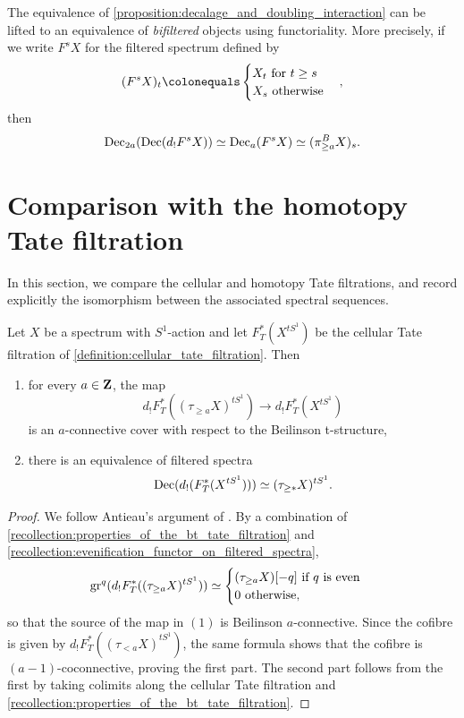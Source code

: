 \documentclass[oneside,a4paper]{amsart}
\begin{document}
\begin{remark}
\label{remark:bifiltered_refinement_of_the_interaction_between_decalage_and_doubling}
The equivalence of \cref{proposition:decalage_and_doubling_interaction} can be lifted to an equivalence of \emph{bifiltered} objects using functoriality. More precisely, if we write $F^{s} X$ for the filtered spectrum defined by 
\[
(F^{s} X)_{t} \colonequals \begin{cases} X_{t} \textnormal{ for } t \geq s \\
X_{s} \textnormal{ otherwise}  
\end{cases}, 
\]
then
\[
\mathrm{Dec}_{2a}(\mathrm{Dec}(d_{!} F^{s}X)) \simeq \mathrm{Dec}_{a}(F^{s}X) \simeq (\pi_{\geq a}^{B} X)_{s}.
\]
\end{remark}

\section{Comparison with the homotopy Tate filtration}

In this section, we compare the cellular and homotopy Tate filtrations, and record explicitly the isomorphism between the associated spectral sequences. 

\begin{theorem}
\label{theorem:decalage_of_evenification_of_bhatt_lurie_tate_is_the_tate_of_postnikov}
Let $X$ be a spectrum with $S^{1}$-action and let $F^{\ast}_{T}(X^{tS^{1}})$ be the cellular Tate filtration of \cref{definition:cellular_tate_filtration}. Then 
\begin{enumerate}
    \item for every $a \in \mathbf{Z}$, the map 
    \[
    d_{!} F_{T}^{\ast}((\tau_{\geq a} X)^{tS^{1}}) \rightarrow d_{!} F_{T}^{\ast}(X^{tS^{1}})
    \]
    is an $a$-connective cover with respect to the Beilinson t-structure, 
    \item there is an equivalence of filtered spectra
    \[
    \mathrm{Dec}(d_{!}(F_{T}^{\ast}(X^{tS^{1}}))) \simeq (\tau_{\geq \ast} X)^{tS^{1}}.
    \]
\end{enumerate}
\end{theorem}

\begin{proof}
We follow Antieau's argument of \cite[Proposition 9.2]{antieau:decalage}. By a combination of \cref{recollection:properties_of_the_bt_tate_filtration} and \cref{recollection:evenification_functor_on_filtered_spectra}, 
\[
\operatorname{gr}^{q}(d_{!} F_{T}^{\ast}((\tau_{\geq a} X)^{tS^{1}})) \simeq  
\begin{cases}
(\tau_{\geq a} X)[-q] \textnormal{ if } q \textnormal{ is even} \\
0 \textnormal{ otherwise},
\end{cases}
\]
so that the source of the map in $(1)$ is Beilinson $a$-connective. Since the cofibre is given by $d_{!} F_{T}^{\ast}((\tau_{< a}X)^{tS^{1}})$, the same formula shows that the cofibre is $(a-1)$-coconnective, proving the first part. The second part follows from the first by taking colimits along the cellular Tate filtration and \cref{recollection:properties_of_the_bt_tate_filtration}.
\end{proof}
\end{document}
